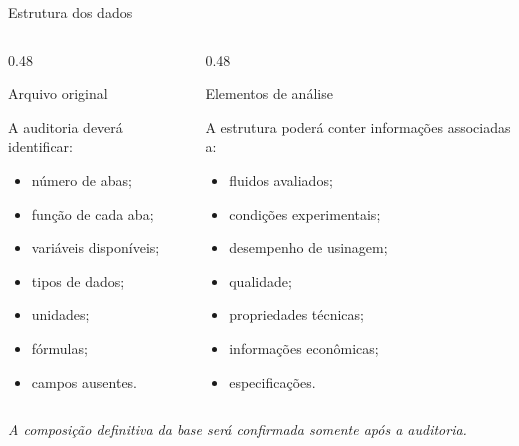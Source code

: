 \begin{frame}{Estrutura dos dados}

    \begin{columns}[T]

        \begin{column}{0.48\textwidth}

            \begin{block}{Arquivo original}

                A auditoria deverá identificar:

                \begin{itemize}
                    \item número de abas;
                    \item função de cada aba;
                    \item variáveis disponíveis;
                    \item tipos de dados;
                    \item unidades;
                    \item fórmulas;
                    \item campos ausentes.
                \end{itemize}

            \end{block}

        \end{column}


        \begin{column}{0.48\textwidth}

            \begin{block}{Elementos de análise}

                A estrutura poderá conter informações associadas a:

                \begin{itemize}
                    \item fluidos avaliados;
                    \item condições experimentais;
                    \item desempenho de usinagem;
                    \item qualidade;
                    \item propriedades técnicas;
                    \item informações econômicas;
                    \item especificações.
                \end{itemize}

            \end{block}

        \end{column}

    \end{columns}

    \vspace{0.3cm}

    \centering
    \textit{A composição definitiva da base será confirmada somente após
    a auditoria.}

\end{frame}


